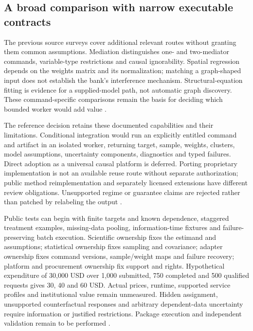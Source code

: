 \subsection{A broad comparison with narrow executable contracts}
The previous source surveys cover additional relevant routes without
granting them common assumptions. Mediation distinguishes one- and
two-mediator commands, variable-type restrictions and causal ignorability.
Spatial regression depends on the weights matrix and its normalization;
matching a graph-shaped input does not establish the bank's interference
mechanism. Structural-equation fitting is evidence for a supplied-model
path, not automatic graph discovery. These command-specific comparisons
remain the basis for deciding which bounded worker would add value
\cite{exec13_ci_stata_mediate,exec20_med_stata_multiple,
exec20_network_stata_spregress,exec13_stata_sem,exec24_stata_choice}.

The reference decision retains these documented capabilities and their
limitations. Conditional integration would run an explicitly entitled
command and artifact in an isolated worker, returning target, sample,
weights, clusters, model assumptions, uncertainty components, diagnostics
and typed failures. Direct adoption as a universal causal platform is
deferred. Porting proprietary implementation is not an available reuse route
without separate authorization; public method reimplementation and
separately licensed extensions have different review obligations.
Unsupported regime or guarantee claims are rejected rather than patched
by relabeling the output \cite{exec13_ivrd_license,exec24_stata_choice}.

Public tests can begin with finite targets and known dependence, staggered
treatment examples, missing-data pooling, information-time fixtures and
failure-preserving batch execution. Scientific ownership fixes the estimand
and assumptions; statistical ownership fixes sampling and covariance;
adapter ownership fixes command versions, sample/weight maps and failure
recovery; platform and procurement ownership fix support and rights.
Hypothetical expenditure of 30,000 USD over 1,000 submitted, 750 completed
and 500 qualified requests gives 30, 40 and 60 USD. Actual prices, runtime,
supported service profiles and institutional value remain unmeasured.
Hidden assignment, unsupported counterfactual responses and arbitrary
dependent-data uncertainty require information or justified restrictions.
Package execution and independent validation remain to be performed \cite{exec24_stata_choice}.
